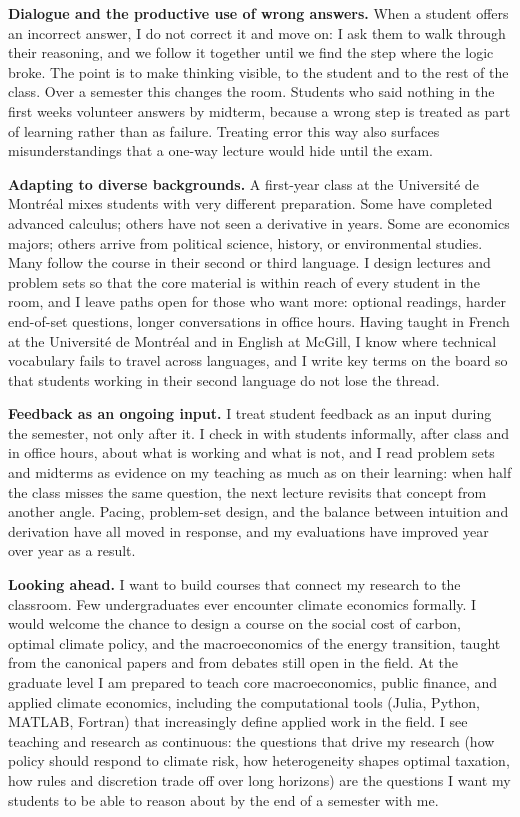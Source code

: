 \documentclass[11pt]{article}
\begin{document}
\textbf{Dialogue and the productive use of wrong answers.}
When a student offers an incorrect answer, I do not correct it and move on: I ask them to walk through their reasoning, and we follow it together until we find the step where the logic broke. The point is to make thinking visible, to the student and to the rest of the class. Over a semester this changes the room. Students who said nothing in the first weeks volunteer answers by midterm, because a wrong step is treated as part of learning rather than as failure. Treating error this way also surfaces misunderstandings that a one-way lecture would hide until the exam.

\textbf{Adapting to diverse backgrounds.}
A first-year class at the Université de Montréal mixes students with very different preparation. Some have completed advanced calculus; others have not seen a derivative in years. Some are economics majors; others arrive from political science, history, or environmental studies. Many follow the course in their second or third language. I design lectures and problem sets so that the core material is within reach of every student in the room, and I leave paths open for those who want more: optional readings, harder end-of-set questions, longer conversations in office hours. Having taught in French at the Université de Montréal and in English at McGill, I know where technical vocabulary fails to travel across languages, and I write key terms on the board so that students working in their second language do not lose the thread.

\textbf{Feedback as an ongoing input.}
I treat student feedback as an input during the semester, not only after it. I check in with students informally, after class and in office hours, about what is working and what is not, and I read problem sets and midterms as evidence on my teaching as much as on their learning: when half the class misses the same question, the next lecture revisits that concept from another angle. Pacing, problem-set design, and the balance between intuition and derivation have all moved in response, and my evaluations have improved year over year as a result.

\textbf{Looking ahead.}
I want to build courses that connect my research to the classroom. Few undergraduates ever encounter climate economics formally. I would welcome the chance to design a course on the social cost of carbon, optimal climate policy, and the macroeconomics of the energy transition, taught from the canonical papers and from debates still open in the field. At the graduate level I am prepared to teach core macroeconomics, public finance, and applied climate economics, including the computational tools (Julia, Python, MATLAB, Fortran) that increasingly define applied work in the field. I see teaching and research as continuous: the questions that drive my research (how policy should respond to climate risk, how heterogeneity shapes optimal taxation, how rules and discretion trade off over long horizons) are the questions I want my students to be able to reason about by the end of a semester with me.
\end{document}
